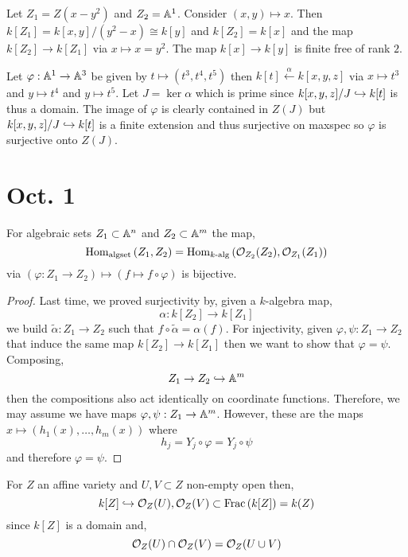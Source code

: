 \documentclass[12pt]{article}
\begin{document}
\begin{example}
Let $Z_1 = Z(x - y^2)$ and $Z_2 = \mathbb{A}^1$. Consider $(x,y) \mapsto x$. Then $k[Z_1] = k[x,y]/(y^2 - x) \cong k[y]$ and $k[Z_2] = k[x]$ and the map $k[Z_2] \to k[Z_1]$ via $x \mapsto x = y^2$. The map $k[x] \to k[y]$ is finite free of rank $2$.
\end{example}

\begin{example}
Let $\varphi : \mathbb{A}^1 \to \mathbb{A}^3$ be given by $t \mapsto (t^3, t^4, t^5)$ then $k[t] \xleftarrow{\alpha} k[x,y,z]$ via $x \mapsto t^3$ and $y \mapsto t^4$ and $y \mapsto t^5$. Let $J = \ker{\alpha}$ which is prime since $k[x,y,z]/J \hookrightarrow k[t]$ is thus a domain. The image of $\varphi$ is clearly contained in $Z(J)$ but $k[x,y,z]/J \hookrightarrow k[t]$ is a finite extension and thus surjective on maxspec so $\varphi$ is surjective onto $Z(J)$. 
\end{example}

\section{Oct. 1}

\begin{thm}
For algebraic sets $Z_1 \subset \mathbb{A}^n$ and $Z_2 \subset \mathbb{A}^m$ the map,
\[ \mathrm{Hom}_{\text{algset}} \left( Z_1, Z_2 \right) = \mathrm{Hom}_{k\text{-alg}} \left( \mathcal{O}_{Z_2}(Z_2), \mathcal{O}_{Z_1}(Z_1) \right) \]
via $(\varphi : Z_1 \to Z_2) \mapsto (f \mapsto f \circ \varphi)$
is bijective.
\end{thm}

\begin{proof}
Last time, we proved surjectivity by, given a $k$-algebra map,
\[ \alpha : k[Z_2] \to k[Z_1] \]
we build $\tilde{\alpha} : Z_1 \to Z_2$ such that $f \circ \tilde{\alpha} = \alpha(f)$. For injectivity, given $\varphi, \psi : Z_1 \to Z_2$ that induce the same map $k[Z_2] \to k[Z_1]$ then we want to show that $\varphi = \psi$. Composing,
\[ Z_1 \to Z_2 \hookrightarrow \mathbb{A}^m \]
then the compositions also act identically on coordinate functions. Therefore, we may assume we have maps $\varphi, \psi : Z_1 \to \mathbb{A}^m$. However, these are the maps $x \mapsto (h_1(x), \dots, h_m(x))$ where 
\[ h_j = Y_j \circ \varphi = Y_j \circ \psi \]
and therefore $\varphi = \psi$.
\end{proof}

\begin{rmk}
For $Z$ an affine variety and $U,V \subset Z$ non-empty open then,
\[ k[Z] \hookrightarrow \mathcal{O}_{Z}(U), \mathcal{O}_{Z}(V) \subset \mathrm{Frac}\left(k[Z]\right) = k(Z) \]
since $k[Z]$ is a domain and,
\[ \mathcal{O}_{Z}(U) \cap \mathcal{O}_{Z}(V) = \mathcal{O}_{Z}(U \cup V) \]
\end{rmk}
\end{document}
